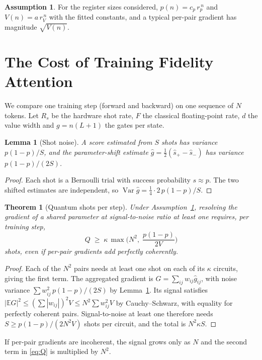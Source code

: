 \documentclass[conference]{IEEEtran}
\newtheorem{theorem}{Theorem}
\newtheorem{lemma}{Lemma}
\theoremstyle{definition}
\newtheorem{assumption}{Assumption}
\begin{document}
\begin{assumption}\label{ass:scaling}
For the register sizes considered, $p(n)=c_p\,r_p^{\,n}$ and $V(n)=a\,r_V^{\,n}$ with the fitted constants, and a typical per-pair gradient has magnitude $\sqrt{V(n)}$.
\end{assumption}

\section{The Cost of Training Fidelity Attention}
\label{sec:cost}

We compare one training step (forward and backward) on one sequence of $N$ tokens. Let $R_s$ be the hardware shot rate, $F$ the classical floating-point rate, $d$ the value width and $g=n(L+1)$ the gates per state.

\begin{lemma}[Shot noise]\label{lem:noise}
A score estimated from $S$ shots has variance $p(1-p)/S$, and the parameter-shift estimate $\hat g=\frac12(\hat s_+-\hat s_-)$ has variance $p(1-p)/(2S)$.
\end{lemma}
\begin{proof}
Each shot is a Bernoulli trial with success probability $s\approx p$. The two shifted estimates are independent, so $\operatorname{Var}\hat g=\frac14\cdot 2\,p(1-p)/S$.
\end{proof}

\begin{theorem}[Quantum shots per step]\label{thm:quantum}
Under Assumption~\ref{ass:scaling}, resolving the gradient of a shared parameter at signal-to-noise ratio at least one requires, per training step,
\begin{equation}
Q\;\ge\;\kappa\,\max\!\Big(N^2,\;\frac{p(1-p)}{2V}\Big)
\label{eq:Q}
\end{equation}
shots, even if per-pair gradients add perfectly coherently.
\end{theorem}
\begin{proof}
Each of the $N^2$ pairs needs at least one shot on each of its $\kappa$ circuits, giving the first term. The aggregated gradient is $G=\sum_{ij}w_{ij}\hat g_{ij}$, with noise variance $\sum w_{ij}^2\,p(1-p)/(2S)$ by Lemma~\ref{lem:noise}. Its signal satisfies $|\mathbb{E}G|^2\le(\sum|w_{ij}|)^2V\le N^2\sum w_{ij}^2V$ by Cauchy--Schwarz, with equality for perfectly coherent pairs. Signal-to-noise at least one therefore needs $S\ge p(1-p)/(2N^2V)$ shots per circuit, and the total is $N^2\kappa S$.
\end{proof}
\noindent If per-pair gradients are incoherent, the signal grows only as $N$ and the second term in \eqref{eq:Q} is multiplied by $N^2$.
\end{document}
